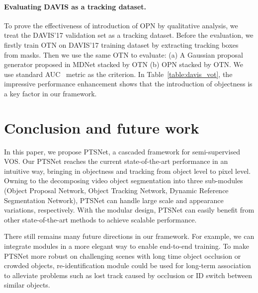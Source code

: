 \documentclass[10pt,twocolumn,letterpaper]{article}
\begin{document}
\paragraph{Evaluating DAVIS as a tracking dataset.}
    To prove the effectiveness of introduction of OPN by qualitative analysis, we treat the DAVIS'17 validation set as a tracking dataset. Before the evaluation, we firstly train OTN on DAVIS'17 training dataset by extracting tracking boxes from masks. Then we use the same OTN to evaluate: (a) A Gaussian proposal generator proposed in MDNet stacked by OTN (b) OPN stacked by OTN. We use standard AUC~\cite{otb2013} metric as the criterion. In Table~\ref{table:davis_vot}, the impressive performance enhancement shows that the introduction of objectness is a key factor in our framework.








\section{Conclusion and future work} \label{Conclusion}
In this paper, we propose PTSNet, a cascaded framework for semi-supervised VOS. Our PTSNet reaches the current state-of-the-art performance in an intuitive way, bringing in objectness and tracking from object level to pixel level. Owning to the decomposing video object segmentation into three sub-modules (Object Proposal Network, Object Tracking Network, Dynamic Reference Segmentation Network), PTSNet can handle large scale and appearance variations, respectively. With the modular design, PTSNet can easily benefit from other state-of-the-art methods to achieve scalable performance. 

There still remains many future directions in our framework. For example, we can integrate modules in a more elegant way to enable end-to-end training. To make PTSNet more robust on challenging scenes with long time object occlusion or crowded objects, re-identification module could be used for long-term association to alleviate problems such as lost track caused by occlusion or ID switch between similar objects. 



{\small
	
	
}
\end{document}

